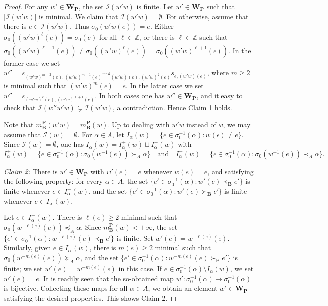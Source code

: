 \documentclass[12pt]{amsart}
\theoremstyle{definition}
\begin{document}
\begin{proof}
For any $w'\in\mathbf{W}_\mathbf{P}$, the set $\mathcal{I}(w'w)$ is finite. Let $w'\in\mathbf{W}_\mathbf{P}$ such that $|\mathcal{I}(w'w)|$ is minimal. We claim that $\mathcal{I}(w'w)=\emptyset$. For otherwise, assume that there is $e\in \mathcal{I}(w'w)$. Thus $\sigma_0(w'w(e))=e$.
Either $\sigma_0((w'w)^\ell(e))=\sigma_0(e)$ for all $\ell\in\mathbb{Z}$, or there is $\ell\in\mathbb{Z}$ such that $\sigma_0((w'w)^{\ell-1}(e))\not=\sigma_0((w'w)^\ell(e))=\sigma_0((w'w)^{\ell+1}(e))$.
In the former case we set $w''=s_{(w'w)^{m-2}(e),(w'w)^{m-1}(e)}\cdots s_{(w'w)(e),(w'w)^2(e)}s_{e,(w'w)(e)}$,
where $m\geq 2$ is minimal such that $(w'w)^m(e)=e$.
In the latter case we set $w''=s_{(w'w)^{\ell}(e),(w'w)^{\ell+1}(e)}$.
In both cases one has $w''\in\mathbf{W}_{\mathbf{P}}$, and it easy to check that $\mathcal{I}(w''w'w)\varsubsetneq \mathcal{I}(w'w)$, a contradiction. Hence Claim 1 holds.


\smallskip

Note that $m_\mathbf{B}^\mathbf{P}(w'w)=m_\mathbf{B}^\mathbf{P}(w)$. Up to dealing with $w'w$ instead of $w$, we may assume that $\mathcal{I}(w)=\emptyset$.
For $\alpha\in A$, let
$I_\alpha(w)=\{e\in \sigma_0^{-1}(\alpha):w(e)\not=e\}$. Since $\mathcal{I}(w)=\emptyset$, one has $I_\alpha(w)=I_\alpha^+(w)\sqcup I_\alpha^-(w)$ with
\[I_\alpha^+(w)=\{e\in \sigma_0^{-1}(\alpha):\sigma_0(w^{-1}(e))\succ_A \alpha\}\quad\mbox{and}\quad I_\alpha^-(w)=\{e\in \sigma_0^{-1}(\alpha):\sigma_0(w^{-1}(e))\prec_A \alpha\}.\]

\smallskip
\noindent
{\it Claim 2:}
There is $w'\in\mathbf{W}_\mathbf{P}$ with $w'(e)=e$ whenever $w(e)=e$, and satisfying the following property:
for every $\alpha\in A$, the set $\{e'\in\sigma_0^{-1}(\alpha):w'(e)\prec_\mathbf{B}e'\}$ is finite whenever $e\in I_\alpha^+(w)$, and the set $\{e'\in\sigma_0^{-1}(\alpha):w'(e)\succ_\mathbf{B}e'\}$ is finite whenever $e\in I_\alpha^-(w)$.

Let $e\in I_\alpha^+(w)$. There is $\ell(e)\geq 2$ minimal such that $\sigma_0(w^{-\ell(e)}(e))\preceq_A\alpha$. Since $m_\mathbf{B}^\mathbf{P}(w)<+\infty$, the set $\{e'\in\sigma_0^{-1}(\alpha):w^{-\ell(e)}(e)\prec_\mathbf{B}e'\}$ is finite. Set $w'(e)=w^{-\ell(e)}(e)$. Similarly, given $e\in I_\alpha^-(w)$, there is $m(e)\geq 2$ minimal such that $\sigma_0(w^{-m(e)}(e))\succeq_A\alpha$, and the set $\{e'\in\sigma_0^{-1}(\alpha):w^{-m(e)}(e)\succ_\mathbf{B}e'\}$ is finite; we set $w'(e)=w^{-m(e)}(e)$ in this case. If $e\in \sigma_0^{-1}(\alpha)\setminus I_\alpha(w)$, we set $w'(e)=e$. It is readily seen that the so-obtained map $w':\sigma_0^{-1}(\alpha)\to\sigma_0^{-1}(\alpha)$ is bijective. Collecting these maps for all $\alpha\in A$, we obtain an element $w'\in\mathbf{W}_\mathbf{P}$ satisfying the desired properties. This shows Claim 2.


\end{proof}
\end{document}
